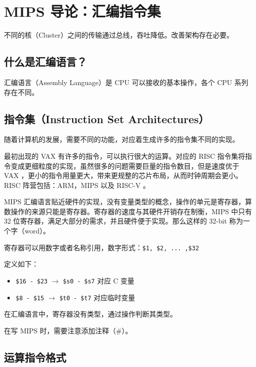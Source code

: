 \documentclass[cn,11pt,chinese,black,simple]{../elegantbook}
\begin{document}
\fi 
\def\chapname{02mips}

\chapter{MIPS 导论：汇编指令集}

不同的核（Cluster）之间的传输通过总线，吞吐降低。改善架构存在必要。

\section{什么是汇编语言？}

汇编语言（Assembly Language）是 CPU 可以接收的基本操作，各个 CPU 系列存在不同。

\section{指令集（Instruction Set Architectures）}

随着计算机的发展，需要不同的功能，对应着生成许多的指令集不同的实现。

最初出现的 VAX 有许多的指令，可以执行很大的运算。对应的 RISC 指令集将指令变成更细粒度的实现，虽然很多的问题需要巨量的指令数目，但是速度优于 VAX ，更小的指令用量更大，带来更规整的芯片布局，从而时钟周期会更小。 RISC 阵营包括：ARM，MIPS 以及 RISC-V 。

MIPS 汇编语言贴近硬件的实现，没有变量类型的概念，操作的单元是寄存器，算数操作的来源只能是寄存器。寄存器的速度与其硬件开销存在制衡，MIPS 中只有 32 位寄存器，满足大部分的需求，并且硬件便于实现。那么这样的 32-bit 称为一个字（word）。

寄存器可以用数字或者名称引用，数字形式：\lstinline{$1, $2, ... ,$32}

定义如下：

\begin{itemize}
    \item \lstinline{$16 - $23} \(\rightarrow\) \lstinline{$s0 - $s7} 对应 C 变量
    \item \lstinline{$8 - $15} \(\rightarrow\) \lstinline{$t0 - $t7} 对应临时变量
\end{itemize}

在汇编语言中，寄存器没有类型，通过操作判断其类型。

在写 MIPS 时，需要注意添加注释（\#）。

\section{运算指令格式}
\end{document}
